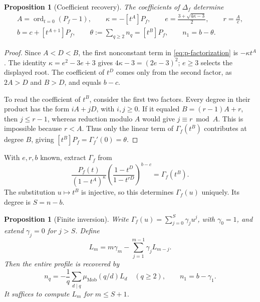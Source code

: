 \documentclass[11pt]{article}
\numberwithin{equation}{section}
\newtheorem{proposition}[theorem]{Proposition}
\theoremstyle{definition}
\theoremstyle{remark}
\newcommand{\mob}{\mu_{\mathrm{Mob}}}
\DeclareMathOperator{\ord}{ord}
\begin{document}
\begin{proposition}[Coefficient recovery]\label{prop:coefficient-recovery}
The coefficients of $\Delta_f$ determine
\begin{equation}\label{eq:parameter-recovery}
 \begin{gathered}
 A=\ord_{t=0}(P_f-1),\qquad
 \kappa=-[t^A]P_f,\qquad
 e=\frac{3+\sqrt{4\kappa-3}}2,\qquad r=\frac Ae,\\
 b=c+[t^{A+1}]P_f,\qquad
 \theta:=\sum_{q\ge2}n_q=[t^B]P_f,\qquad n_1=b-\theta.
 \end{gathered}
\end{equation}
\end{proposition}

\begin{proof}
Since $A<D<B$, the first nonconstant term in
\eqref{eq:p-factorization} is $-\kappa t^A$.
The identity $\kappa=e^2-3e+3$ gives
$4\kappa-3=(2e-3)^2$; $e\ge3$ selects the displayed root.
The coefficient of $t^D$ comes only from the second factor,
as $2A>D$ and $B>D$, and equals $b-c$.

To read the coefficient of $t^B$, consider the first two factors.
Every degree in their product has the form $iA+jD$, with
$i,j\ge0$. If it equaled $B=(r-1)A+r$, then $j\le r-1$,
whereas reduction modulo $A$ would give $j\equiv r\bmod A$.
This is impossible because $r<A$. Thus only the linear term
of $\Gamma_f(t^B)$ contributes at degree $B$, giving
$[t^B]P_f=\Gamma_f'(0)=\theta$.
\end{proof}

With $e,r,b$ known, extract $\Gamma_f$ from
\begin{equation}\label{eq:gamma-extraction}
 \frac{P_f(t)}{(1-t^A)^\kappa}
       \left(\frac{1-t^D}{1-t^{rD}}\right)^{b-c}
       =\Gamma_f(t^B).
\end{equation}
The substitution $u\mapsto t^B$ is injective, so this determines
$\Gamma_f(u)$ uniquely. Its degree is $S=n-b$.

\begin{proposition}[Finite inversion]\label{prop:finite-inversion}
Write $\Gamma_f(u)=\sum_{j=0}^S\gamma_j u^j$, with
$\gamma_0=1$, and extend $\gamma_j=0$ for $j>S$. Define
\begin{equation}\label{eq:log-recurrence}
 L_m=m\gamma_m-\sum_{j=1}^{m-1}\gamma_jL_{m-j}.
\end{equation}
Then the entire profile is recovered by
\begin{equation}\label{eq:mobius-recovery}
 n_q=-\frac1q\sum_{d\mid q}\mob(q/d)L_d\quad(q\ge2),
 \qquad n_1=b-\gamma_1.
\end{equation}
It suffices to compute $L_m$ for $m\le S+1$.
\end{proposition}
\end{document}
